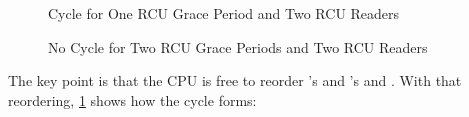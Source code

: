 \begin{figure}[tbp]
\centering
{}
\caption{Cycle for One RCU Grace Period and Two RCU Readers}
\label{fig:memorder:Cycle for One RCU Grace Period and Two RCU Readers}
\end{figure}

\begin{figure}[tbp]
\centering
{}
\caption{No Cycle for Two RCU Grace Periods and Two RCU Readers}
\label{fig:memorder:No Cycle for Two RCU Grace Periods and Two RCU Readers}
\end{figure}

The key point is that the CPU is free to reorder 's and 's
 and .
With that reordering,
\cref{fig:memorder:Cycle for One RCU Grace Period and Two RCU Readers}
shows how the cycle forms:

